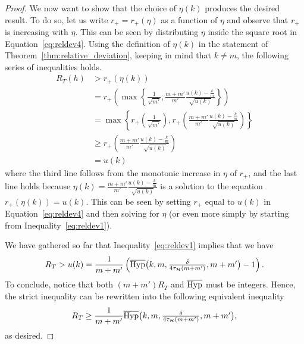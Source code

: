 \documentclass[twoside,11pt]{article}
\newcommand{\pr}[1]{\left(#1\right)}
\newcommand{\cb}[1]{\left\{#1\right\}}
\renewcommand{\H}{{\mathcal{H}}}
\newcommand{\eqdef}{\overset{\smash{\mbox{\tiny \rm def}}}{=}}
\newcommand{\HypInv}{\overline{\textnormal{Hyp}}}
\begin{document}
\begin{proof}
We now want to show that the choice of $\eta(k)$ produces the desired result.
To do so, let us write $r_+ = r_+(\eta)$ as a function of $\eta$ and observe that $r_+$ is increasing with $\eta$.
This can be seen by distributing $\eta$ inside the square root in Equation~\eqref{eq:reldev4}.
Using the definition of $\eta(k)$ in the statement of Theorem~\ref{thm:relative_deviation}, keeping in mind that $k\neq m$, the following series of inequalities holds.
\begin{align*}
    R_T(h)
    &> r_+(\eta(k))\\
    &= r_+\pr{\max\cb{ \textstyle \frac{1}{\sqrt{m'}},  \frac{m+m'}{m'}\frac{u(k) - \frac{k}{m}}{\sqrt{u(k)}}}}\\
    &= \max\cb{\textstyle  r_+\pr{\frac{1}{\sqrt{m'}}}, r_+\pr{ \frac{m+m'}{m'}\frac{u(k) - \frac{k}{m}}{\sqrt{u(k)}} } }\\
    &\ge r_+\pr{\textstyle  \frac{m+m'}{m'}\frac{u(k) - \frac{k}{m}}{\sqrt{u(k)}}}\\
    &= u(k)
\end{align*}
where the third line follows from the monotonic increase in $\eta$ of $r_+$, and the last line holds because $\eta(k) = \frac{m+m'}{m'}\frac{u(k) - \frac{k}{m}}{\sqrt{u(k)}}$ is a solution to the equation $r_+(\eta(k)) = u(k)$.
This can be seen by setting $r_+$ equal to $u(k)$ in Equation~\eqref{eq:reldev4} and then solving for $\eta$ (or even more simply by starting from Inequality~\eqref{eq:reldev1}).

We have gathered so far that Inequality~\eqref{eq:reldev1} implies that we have
\begin{equation*}
    R_T > u(k) = \frac{1}{m+m'}\pr{\HypInv\big(k, m, \textstyle\frac{\delta}{4 \tau_\H(m + m')}, m + m'\big)-1}.
\end{equation*}
To conclude, notice that both $(m+m')R_T$ and $\HypInv$ must be integers.
Hence, the strict inequality can be rewritten into the following equivalent inequality
\begin{equation*}
    R_T \ge \frac{1}{m+m'}\HypInv\big(k, m, \textstyle\frac{\delta}{4 \tau_\H(m + m')}, m + m'\big),
\end{equation*}
as desired.


\end{proof}
\end{document}
